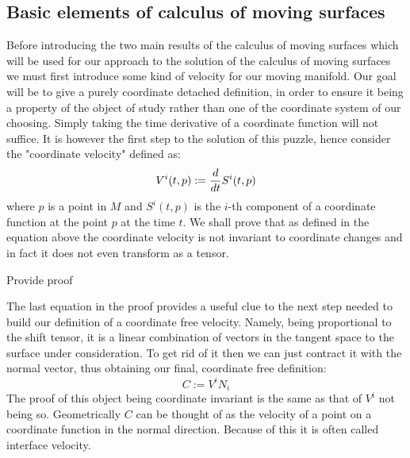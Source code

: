 \documentclass[../main.tex]{subfiles}
\begin{document}
        \subsection{Basic elements of calculus of moving surfaces}
        Before introducing the two main results of the calculus of moving surfaces which will be used for our approach to the solution of the calculus of moving surfaces we must first introduce some kind of velocity for our moving manifold. Our goal will be to give a purely coordinate detached definition, in order to ensure it being a property of the object of study rather than one of the coordinate system of our choosing. Simply taking the time derivative of a coordinate function will not suffice. It is however the first step to the solution of this puzzle, hence consider the "coordinate velocity" defined as:
        \begin{equation}
            V^{i}(t,p):=\dfrac{d}{dt}S^{i}(t,p)
        \end{equation}
        where $p$ is a point in $M$ and $S^{i}(t,p)$ is the $i$-th component of a coordinate function at the point $p$ at the time $t$. We shall prove that as defined in the equation above the coordinate velocity is not invariant to coordinate changes and in fact it does not even transform as a tensor.
        
        Provide proof
        
        The last equation in the proof provides a useful clue to the next step needed to build our definition of a coordinate free velocity. Namely, being proportional to the shift tensor, it is a linear combination of vectors in the tangent space to the surface under consideration. To get rid of it then we can just contract it with the normal vector, thus obtaining our final, coordinate free definition:
        \begin{equation}
            C:=V^{i}N_{i}
        \end{equation}
        The proof of this object being coordinate invariant is the same as that of $V^{i}$ not being so. Geometrically $C$ can be thought of as the velocity of a point on a coordinate function in the normal direction. Because of this it is often called interface velocity. 
        
\end{document}
